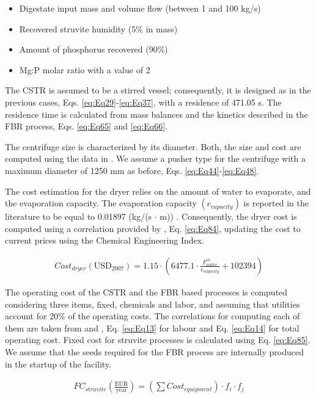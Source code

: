 \begin{refsection}[referencesCh2]
\begin{itemize}
	\item Digestate input mass and volume flow (between 1 and 100 kg/s)
	\item Recovered struvite humidity (5\% in mass)
	\item Amount of phosphorus recovered (90\%)
	\item Mg:P molar ratio with a value of 2
\end{itemize}

The CSTR is assumed to be a stirred vessel; consequently, it is designed as in the previous cases, Eqs. \ref{eq:Eq29}-\ref{eq:Eq37}, with a residence of 471.05 s. The residence time is calculated from mass balances and the kinetics described in the FBR process, Eqs. \ref{eq:Eq65} and \ref{eq:Eq66}.

The centrifuge size is characterized by its diameter. Both, the size and cost are computed using the data in \citet{green2008perry}. We assume a pusher type for the centrifuge with a maximum diameter of 1250 mm as before, Eqs. \ref{eq:Eq44}-\ref{eq:Eq48}.

The cost estimation for the dryer relies on the amount of water to evaporate, and the evaporation capacity. The evaporation capacity $\left(e_{capacity}\right)$ is reported in the literature to be equal to 0.01897 (kg/(s $\cdot$ m)) \citep{walas1988chemical}. Consequently, the dryer cost is computed using a correlation provided by \citet{martin2011energy}, Eq. \ref{eq:Eq84}, updating the cost to current prices using the Chemical Engineering Index.

\begin{align}
	Cost_{dryer}\left( \text{USD}_ {2007} \right) = 1.15 \cdot \left( {6477.1 \cdot \frac{F_{water}^{in}}{e_{capacity}} + 102394} \right) \label{eq:Eq84}
\end{align}

The operating cost of the CSTR and the FBR based processes is computed considering three items, fixed, chemicals and labor, and assuming that utilities account for 20\% of the operating costs. The correlations for computing each of them are taken from \citet{vian1975pronostico} and \citet{sinnott1999chemical}, Eq. \ref{eq:Eq13} for labour and Eq. \ref{eq:Eq14} for total operating cost. Fixed cost for struvite processes is calculated using Eq. \ref{eq:Eq85}. We assume that the seeds required for the FBR process are internally produced in the startup of the facility.

\begin{align}
	FC_{struvite} \left( \frac{\text{EUR}}{\text{year}} \right) = \left( \sum {Cost_{equipment}} \right) \cdot {f_i}\cdot{f_j} \label{eq:Eq85}
\end{align}


\end{refsection}
